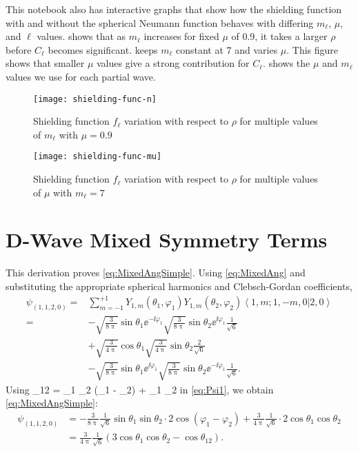 \documentclass[Dissertation.tex]{subfiles}
\begin{document}
This notebook also has interactive graphs that show how the shielding function
with and without the spherical Neumann function behaves with differing $m_\ell$,
$\mu$, and $\ell$ values.  shows that as $m_\ell$
increases for fixed $\mu$ of 0.9, it takes a larger $\rho$ before $C_\ell$
becomes significant.  keeps $m_\ell$ constant at 7
and varies $\mu$. This figure shows that smaller $\mu$ values give a strong
contribution for $C_\ell$.  shows the $\mu$ and $m_\ell$
values we use for each partial wave.
\begin{figure}
	\centering
	\texttt{[image: shielding-func-n]}
	\caption{Shielding function $f_\ell$ variation with respect to $\rho$ for multiple values of $m_\ell$ with $\mu = 0.9$}
	\label{fig:shielding-func-n}
\end{figure}
\begin{figure}
	\centering
	\texttt{[image: shielding-func-mu]}
	\caption{Shielding function $f_\ell$ variation with respect to $\rho$ for multiple values of $\mu$ with $m_\ell = 7$}
	\label{fig:shielding-func-mu}
\end{figure}


\section{D-Wave Mixed Symmetry Terms}
\label{sec:MixedDerivation}

This derivation proves \cref{eq:MixedAngSimple}. Using \cref{eq:MixedAng} and
substituting the appropriate spherical harmonics and Clebsch-Gordan coefficients,
\begin{align}
\label{eq:Psi1}
\psi_{(1,1,2,0)} = &\sum_{m=-1}^{+1} Y_{1,m}(\theta_1,\varphi_1) Y_{1,m}(\theta_2,\varphi_2) \left< 1,m; 1,-m,0 | 2,0 \right> \nonumber \\
	= &-\sqrt{\frac{3}{8\uppi}} \sin\theta_1 \ee^{-\ii \varphi_1} \sqrt{\frac{3}{8\uppi}} \sin\theta_2 \ee^{\ii \varphi_1} \frac{1}{\sqrt{6}} \nonumber \\
	& + \sqrt{\frac{3}{4\uppi}} \cos\theta_1 \sqrt{\frac{3}{4\uppi}} \sin\theta_2 \frac{2}{\sqrt{6}} \nonumber \\
	& -\sqrt{\frac{3}{8\uppi}} \sin\theta_1 \ee^{\ii \varphi_1} \sqrt{\frac{3}{8\uppi}} \sin\theta_2 \ee^{-\ii \varphi_1} \frac{1}{\sqrt{6}}.
\end{align}
Using \cite[p.192]{VanReethThesis}
\beq
\cos\theta_{12} = \sin\theta_1 \sin\theta_2 \cos(\varphi_1 - \varphi_2) + \cos\theta_1 \cos\theta_2
\eeq
in \cref{eq:Psi1}, we obtain \cref{eq:MixedAngSimple}:
\begin{align}
\label{eq:Psi2}
\psi_{(1,1,2,0)} &= -\frac{3}{8\uppi} \frac{1}{\sqrt{6}} \sin\theta_1 \sin\theta_2 \cdot 2 \cos(\varphi_1 - \varphi_2) + \frac{3}{4\uppi} \frac{1}{\sqrt{6}} \cdot 2 \cos\theta_1 \cos\theta_2 \nonumber \\
&= \frac{3}{4\uppi} \frac{1}{\sqrt{6}} \left(3 \cos\theta_1 \cos\theta_2 - \cos\theta_{12} \right).
\end{align}
\end{document}

